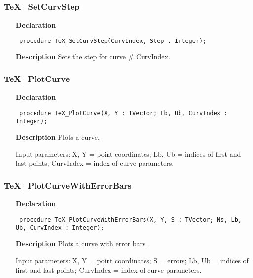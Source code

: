 \documentclass[12pt,a4paper,oneside]{report}
\newcommand{\declarationitem}[1]{\textbf{#1}}
\newcommand{\descriptiontitle}[1]{\textbf{#1}}
\newcommand{\code}[1]{\texttt{#1}}
\begin{document}
\subsubsection{TeX{\_}SetCurvStep}
\label{utexplot-TeX_SetCurvStep}
\begin{itemize}\item[\declarationitem{Declaration}\hfill]
	\begin{flushleft}
		\code{
			procedure TeX{\_}SetCurvStep(CurvIndex, Step : Integer);}
		
	\end{flushleft}
	
	\par
	\item[\descriptiontitle{Description}]
	Sets the step for curve {\#} CurvIndex.
	
\end{itemize}
\subsubsection{TeX{\_}PlotCurve}
\label{utexplot-TeX_PlotCurve}
\begin{itemize}\item[\declarationitem{Declaration}\hfill]
	\begin{flushleft}
		\code{
			procedure TeX{\_}PlotCurve(X, Y : TVector; Lb, Ub, CurvIndex : Integer);}
		
	\end{flushleft}
	
	\par
	\item[\descriptiontitle{Description}]
	Plots a curve.
	
	Input parameters: X, Y = point coordinates; Lb, Ub = indices of first and last points; CurvIndex = index of curve parameters.
	
\end{itemize}
\subsubsection{TeX{\_}PlotCurveWithErrorBars}
\label{utexplot-TeX_PlotCurveWithErrorBars}
\begin{itemize}\item[\declarationitem{Declaration}\hfill]
	\begin{flushleft}
		\code{
			procedure TeX{\_}PlotCurveWithErrorBars(X, Y, S : TVector; Ns, Lb, Ub, CurvIndex : Integer);}
		
	\end{flushleft}
	
	\par
	\item[\descriptiontitle{Description}]
	Plots a curve with error bars.
	
	Input parameters: X, Y = point coordinates; S = errors; Lb, Ub = indices of first and last points; CurvIndex = index of curve parameters.
	
\end{itemize}
\end{document}
